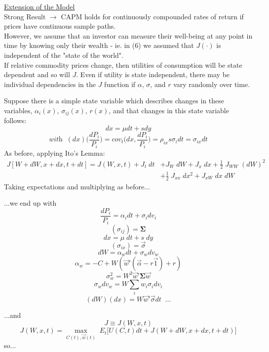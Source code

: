 \documentclass[
14pt,notheorems,hyperref={pdfauthor=whatever}
]{beamer}
\begin{document}
\begin{frame}
\underline{Extension of the Model}\\
\hfill\break
Strong Result $\longrightarrow$ CAPM holds for continuously compounded rates of return if prices have continuous sample paths.\\
\hfill\break
However, we assume that an investor can measure their well-being at any point in time by knowing only their wealth - ie. in (6) we assumed that $J(\cdot)$ is independent of the "state of the world".\\
\hfill\break
If relative commodity prices change, then utilities of consumption will be state dependent and so will $J$. Even if utility is state independent, there may be individual dependencies in the $J$ function if $\alpha$, $\sigma$, and $r$ vary randomly over time.
\end{frame}

\begin{frame}
Suppose there is a simple state variable which describes changes in these variables, $\alpha_i(x)$, $\sigma_{ij}(x)$, $r(x)$, and that changes in this state variable follows:\\
\[ dx = \mu dt + s dy \]
\[\textit{with}\;\; (dx)\bigg(\frac{dP_i}{P_i}\bigg) = cov_t\bigg(dx,\frac{dP_i}{P_i}\bigg) = \rho_{ix} s \sigma_i dt = \sigma_{ix} dt\]
As before, applying Ito's Lemma:\\
\begin{align*}
    J[W+dW, x+dx, t+dt] = J(W,x,t)+J_t\;dt &+ J_W\;dW + J_x\;dx + \frac{1}{2}\;J_{WW}\;(dW)^2\\
    &+ \frac{1}{2}\;J_{xx}\;dx^2+J_{xW}\;dx\;dW
\end{align*}
Taking expectations and multiplying as before...
\end{frame}

\begin{frame}
...we end up with\\
\[ \frac{dP_i}{P_i} = \alpha_i dt + \sigma_i dv_i \]
\[ (\sigma_{ij}) = \bm{\Sigma} \]
\[ dx = \mu\;dt + s\;dy \]
\[ (\sigma_{ix}) = \vec{\sigma} \]
\[ dW = \alpha_w dt + \sigma_w dv_w\]
\[ \alpha_w = -C+W(\vec{w}'(\vec{\alpha}-r\vec{1})+r)\]
\[ \sigma_w^2 = W^2\vec{w}' \bm{\Sigma} \vec{w} \]
\[ \sigma_w dv_w = W \sum_i w_i \sigma_i dv_i \]
\[ (dW)(dx) = W\vec{w}'\vec{\sigma} dt \;\; \textit{...}\]
\end{frame}

\begin{frame}
...and\\
\[ J \equiv J(W,x,t) \]
\[ J(W,x,t) = \max_{C(t),\vec{w}(t)}\; E_t \bigg[ U(C,t)dt+J(W+dW,x+dx,t+dt)\bigg]\]
so...
\end{frame}
\end{document}
